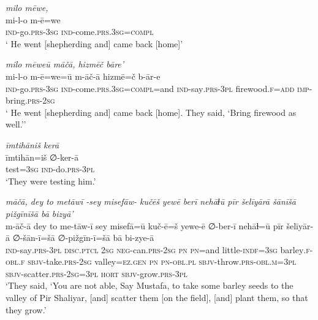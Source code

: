 \ea \label{ŽP.23}
\textit{milo mēwe,} \\ 
\gll mi-l-o m-ē=we \\ 
 \textsc{ind-}go\textsc{.prs}\textsc{-3sg} \textsc{ind-}come\textsc{.prs}\textsc{.3sg}\textsc{=compl} \\ 
\glt ` He went [shepherding and] came back [home]'
\z 
 
\ea \label{ŽP.24}
\textit{milo mēweū māčā, hizmēč bāre’} \\ 
\gll mi-l-o m-ē=we=ū m-āč-ā hizmē=č b-ār-e \\ 
 \textsc{ind-}go\textsc{.prs}\textsc{-3sg} \textsc{ind-}come\textsc{.prs}\textsc{.3sg}\textsc{=compl}=and \textsc{ind-}say\textsc{.prs}\textsc{-3pl} firewood\textsc{.f}\textsc{=add} \textsc{imp-}bring\textsc{.prs}-\textsc{2sg} \\ 
\glt ` He went [shepherding and] came back [home]. They said, ‘Bring firewood as well.’'
\z 
 
\ea \label{ŽP.26}
\textit{īmtihāniš kerā} \\ 
\gll īmtihān=iš ∅-ker-ā \\ 
 test\textsc{=3sg} \textsc{ind-}do\textsc{.prs}\textsc{-3pl} \\ 
\glt `They were testing him.'
\z 
 
\ea \label{ŽP.27}
\textit{māčā, dey to metāwī -sey misefāw- kučēš yewē berī nehāɫū pīr šelīyārā šānīšā pižgīnīšā bā bizyā’} \\ 
\gll m-āč-ā dey to me-tāw-ī sey misefā=ū kuč-ē=š yewe-ē ∅-ber-ī nehāɫ=ū pīr šelīyār-ā ∅-šān-ī=šā ∅-pižgīn-ī=šā bā bi-zye-ā \\ 
 \textsc{ind-}say\textsc{.prs}\textsc{-3pl} \textsc{disc.ptcl} \textsc{2sg} \textsc{neg-}can\textsc{.prs}-\textsc{2sg} \textsc{pn} \textsc{pn}=and little\textsc{-indf}\textsc{=3sg} barley\textsc{.f}\textsc{-obl}\textsc{.f} \textsc{sbjv-}take\textsc{.prs}-\textsc{2sg} valley\textsc{\textsc{=ez.gen}} \textsc{pn} \textsc{pn}\textsc{-obl}\textsc{.pl} \textsc{sbjv-}throw\textsc{.prs}\textsc{-obl}\textsc{.m}\textsc{=3pl} \textsc{sbjv-}scatter\textsc{.prs}-\textsc{2sg}\textsc{=3pl} \textsc{hort} \textsc{sbjv-}grow\textsc{.prs}\textsc{-3pl} \\ 
\glt `They said, ‘You are not able, Say Mustafa, to take some barley seeds to the valley of Pir Shaliyar, [and] scatter them [on the field], [and] plant them, so that they grow.'
\z 
 
